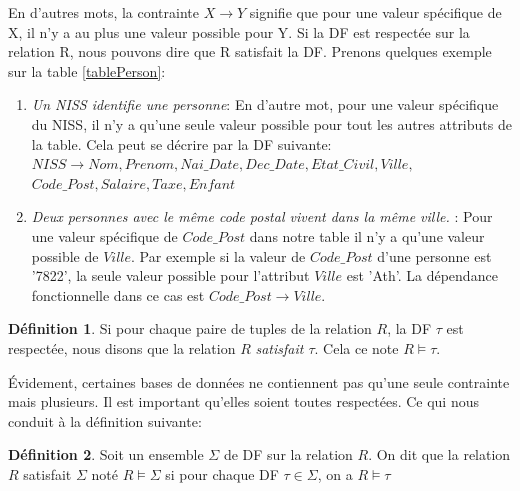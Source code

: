 \documentclass[letterpaper, 12pt]{report}
\theoremstyle{definition}
\newtheorem{mydef}{Définition}
\begin{document}
En d'autres mots, la contrainte $X \rightarrow Y$ signifie que pour une valeur spécifique de X, il n'y a au plus une valeur possible pour Y. Si la DF est respectée sur la relation R, nous pouvons dire que R satisfait la DF. Prenons quelques exemple sur la table \ref{tablePerson}:

\begin{enumerate}
\item \emph{Un NISS identifie une personne}: En d'autre mot, pour une valeur spécifique du NISS, il n'y a qu'une seule valeur possible pour tout les autres attributs de la table. Cela peut se décrire par la DF suivante:
$ NISS \rightarrow Nom, Prenom, Nai\_Date, Dec\_Date, Etat\_Civil, Ville,$ $Code\_Post, Salaire, Taxe, Enfant$
\item \emph{Deux personnes avec le même code postal vivent dans la même ville.} : Pour une valeur spécifique de $Code\_Post$ dans notre table il n'y a qu'une valeur possible de $Ville$. Par exemple si la valeur de $Code\_Post$ d'une personne est '7822', la seule valeur possible pour l'attribut $Ville$ est 'Ath'. La dépendance fonctionnelle dans ce cas est $Code\_Post \rightarrow Ville$.
\end{enumerate}

\begin{mydef}
Si pour chaque paire de tuples de la relation $R$, la DF $\tau$ est respectée, nous disons que la relation $R$ \emph{satisfait $\tau$}. Cela ce note $R \models \tau$.
\end{mydef}

Évidement, certaines bases de données ne contiennent pas qu'une seule contrainte mais plusieurs. Il est important qu'elles soient toutes respectées. Ce qui nous conduit à la définition suivante:
  
\begin{mydef}
Soit un ensemble $\Sigma$ de DF sur la relation $R$. On dit que la relation $R$ satisfait $\Sigma$ noté $R \models \Sigma$ si pour chaque DF $ \tau \in \Sigma$, on a $R \models \tau$
\end{mydef}
\end{document}
